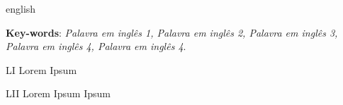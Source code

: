 \begin{resumo}[Abstract]
\begin{otherlanguage*}{english}

\lipsum[3-4]

	\vspace{\onelineskip}

	\noindent
	\textbf{Key-words}: \textit{Palavra em inglês 1, Palavra em inglês 2, Palavra em inglês 3, Palavra em inglês 4, Palavra em inglês 4}.

\end{otherlanguage*}
\end{resumo}


\begin{KeepFromToc} %
\listoffigures
\cleardoublepage






\end{KeepFromToc}

\begin{siglas}
	\item[LI]       Lorem Ipsum
    \item[LII]		Lorem Ipsum Ipsum

\end{siglas}

\tableofcontents*
\cleardoublepage



